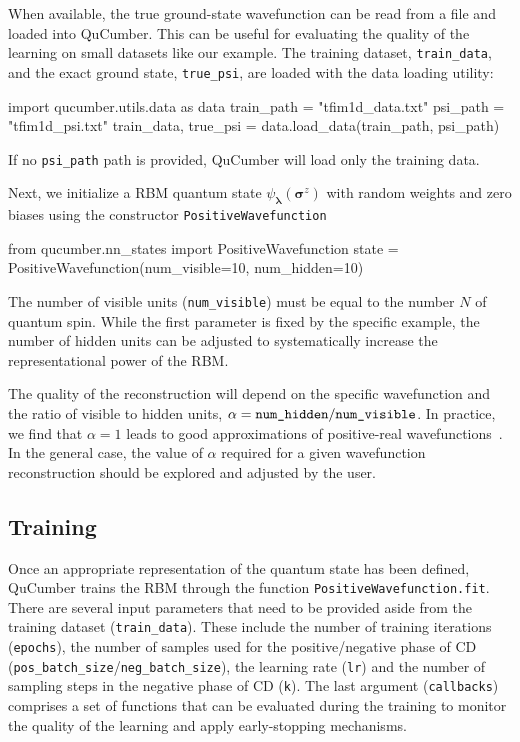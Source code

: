 \documentclass[submission, Phys, hidelinks]{SciPost}
\begin{document}
When available, the true ground-state wavefunction can be read from a file and loaded into QuCumber. This can be useful for evaluating the quality of the learning on small datasets like our example.
The training dataset, \verb|train_data|, and the exact ground state, \verb|true_psi|, are loaded with the data loading utility:
\begin{python}
import qucumber.utils.data as data
train_path = "tfim1d_data.txt"
psi_path = "tfim1d_psi.txt"
train_data, true_psi = data.load_data(train_path, psi_path)
\end{python}
If no \verb|psi_path| path is provided, QuCumber will load only the training data. 

Next, we initialize a RBM quantum state $\psi_{\bm{\lambda}}(\bm{\sigma}^z)$ with random weights and zero biases using the constructor \verb|PositiveWavefunction|
\begin{python}
from qucumber.nn_states import PositiveWavefunction
state = PositiveWavefunction(num_visible=10, num_hidden=10)
\end{python}
The number of visible units (\verb|num_visible|) must be equal to the number $N$ of quantum spin. While the first parameter is fixed by the specific example, the number of hidden units can be adjusted to systematically increase the representational power of the RBM. 

The quality of the reconstruction will depend on the specific wavefunction and the ratio of visible to hidden units, $\alpha = \verb|num_hidden|/\verb|num_visible|$.
In practice, we find that $\alpha = 1$ leads to good approximations of positive-real wavefunctions~\cite{Torlai2016thermo}.
In the general case, the value of $\alpha$ required for a given wavefunction reconstruction should be explored and adjusted by the user.


\subsection{Training}
Once an appropriate representation of the quantum state has been defined, QuCumber trains the RBM through the function \verb|PositiveWavefunction.fit|. There are several input parameters that need to be provided aside from the training dataset (\verb|train_data|). These include the number of training iterations (\verb|epochs|), the number of samples used for the positive/negative phase of CD (\verb|pos_batch_size|/\verb|neg_batch_size|), the learning rate (\verb|lr|) and the number of sampling steps in the negative phase of CD (\verb|k|). The last argument (\verb|callbacks|) comprises a set of functions that can be evaluated during the training to monitor the quality of the learning and apply early-stopping mechanisms. 
\end{document}

